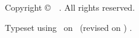 %
%
%
\thispagestyle{empty}
\vspace*{\fill}

\begin{itshape}
    \small
    \makeatletter
    Copyright \copyright\ \@dtm@ini@year\ \theauthor.
    \makeatother
    All rights reserved.\par
    Typeset using \LaTeXe\ on %
    \ifinitial%
    \else%
        ~(revised on )%
    \fi.
\end{itshape}
